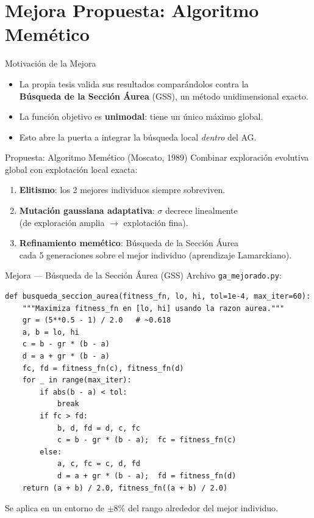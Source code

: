 \documentclass[10pt]{beamer}
\begin{document}
\section{Mejora Propuesta: Algoritmo Memético}
\begin{frame}{Motivación de la Mejora}
  \begin{itemize}
    \item La propia tesis valida sus resultados comparándolos contra la\\
          \textbf{Búsqueda de la Sección Áurea} (GSS), un método unidimensional exacto.
    \item La función objetivo es \textbf{unimodal}: tiene un único máximo global.
    \item Esto abre la puerta a integrar la búsqueda local \emph{dentro} del AG.
  \end{itemize}

  \vspace{0.4cm}

  \begin{block}{Propuesta: Algoritmo Memético (Moscato, 1989)}
    Combinar exploración evolutiva global con explotación local exacta:\\[0.3em]
    \begin{enumerate}
      \item \textbf{Elitismo}: los 2 mejores individuos siempre sobreviven.
      \item \textbf{Mutación gaussiana adaptativa}: $\sigma$ decrece linealmente\\
            (de exploración amplia $\to$ explotación fina).
      \item \textbf{Refinamiento memético}: Búsqueda de la Sección Áurea\\
            cada 5 generaciones sobre el mejor individuo (aprendizaje Lamarckiano).
    \end{enumerate}
  \end{block}
\end{frame}

\begin{frame}[fragile]{Mejora — Búsqueda de la Sección Áurea (GSS)}
  Archivo \texttt{ga\_mejorado.py}:

  \begin{lstlisting}
def busqueda_seccion_aurea(fitness_fn, lo, hi, tol=1e-4, max_iter=60):
    """Maximiza fitness_fn en [lo, hi] usando la razon aurea."""
    gr = (5**0.5 - 1) / 2.0   # ~0.618
    a, b = lo, hi
    c = b - gr * (b - a)
    d = a + gr * (b - a)
    fc, fd = fitness_fn(c), fitness_fn(d)
    for _ in range(max_iter):
        if abs(b - a) < tol:
            break
        if fc > fd:
            b, d, fd = d, c, fc
            c = b - gr * (b - a);  fc = fitness_fn(c)
        else:
            a, c, fc = c, d, fd
            d = a + gr * (b - a);  fd = fitness_fn(d)
    return (a + b) / 2.0, fitness_fn((a + b) / 2.0)
  \end{lstlisting}

  Se aplica en un entorno de $\pm 8\%$ del rango alrededor del mejor individuo.
\end{frame}
\end{document}
